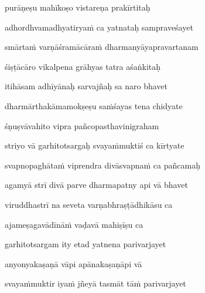 purāṇeṣu mahīkoṣo vistareṇa prakīrtitaḥ\thinspace{\dandab} \dontdisplaylinenum

adhordhvamadhyatirya\.m ca yatnataḥ sampraveśayet \veg\dontdisplaylinenum

smārta\.m varṇāśramācāra\.m dharmanyāyapravartanam\thinspace{\dandab} \dontdisplaylinenum

śiṣṭācāro vikalpena grāhyas tatra aśaṅkitaḥ \veg\dontdisplaylinenum

itihāsam adhīyānaḥ sarvajñaḥ sa naro bhavet\thinspace{\dandab} \dontdisplaylinenum

dharmārthakāmamokṣeṣu sa\.mśayas tena chidyate \veg\dontdisplaylinenum


śṇuṣvāvahito vipra pañcopasthavinigraham\thinspace{\dandab} \dontdisplaylinenum

striyo vā garhitotsargaḥ svaya\.mmuktiś ca kīrtyate \veg\dontdisplaylinenum

svapnopaghāta\.m viprendra divāsvapna\.m ca pañcamaḥ\thinspace{\dandab} \dontdisplaylinenum

agamyā strī divā parve dharmapatny api vā bhavet \veg\dontdisplaylinenum

viruddhastrī na seveta varṇabhraṣṭādhikāsu ca\thinspace{\dandab} \dontdisplaylinenum

ajameṣagavādīnā\.m vaḍavā mahiṣīṣu ca \veg\dontdisplaylinenum

garhitotsargam ity etad yatnena parivarjayet\thinspace{\dandab} \dontdisplaylinenum

anyonyakaṣaṇā vāpi apānakaṣaṇāpi vā \veg\dontdisplaylinenum

svaya\.mmuktir iya\.m jñeyā tasmāt tā\.m parivarjayet\thinspace{\dandab} \dontdisplaylinenum

